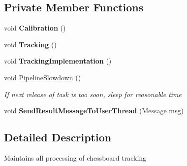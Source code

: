 \subsection*{Private Member Functions}
\begin{DoxyCompactItemize}
\item 
\mbox{\label{class_chess_tracking_1_1_image_processing_1_1_pipeline_parts_1_1_general_1_1_pipeline_a8cbd1f4411b36a3ec951ca8e804c4d10}} 
void {\bfseries Calibration} ()
\item 
\mbox{\label{class_chess_tracking_1_1_image_processing_1_1_pipeline_parts_1_1_general_1_1_pipeline_a1154d48981d3083b4162e49d1e10f9d2}} 
void {\bfseries Tracking} ()
\item 
\mbox{\label{class_chess_tracking_1_1_image_processing_1_1_pipeline_parts_1_1_general_1_1_pipeline_a8c2bf1b5d60c2933f448f337535d6736}} 
void {\bfseries Tracking\+Implementation} ()
\item 
void \mbox{\hyperlink{class_chess_tracking_1_1_image_processing_1_1_pipeline_parts_1_1_general_1_1_pipeline_a6614378b08acc03caa79ba47e3a6871e}{Pipeline\+Slowdown}} ()
\begin{DoxyCompactList}\small\item\em If next release of task is too soon, sleep for reasonable time \end{DoxyCompactList}\item 
\mbox{\label{class_chess_tracking_1_1_image_processing_1_1_pipeline_parts_1_1_general_1_1_pipeline_a1d2d93453628e5c8aaeee9a644ce7da9}} 
void {\bfseries Send\+Result\+Message\+To\+User\+Thread} (\mbox{\hyperlink{class_chess_tracking_1_1_multithreading_messages_1_1_message}{Message}} msg)
\end{DoxyCompactItemize}


\subsection{Detailed Description}
Maintains all processing of chessboard tracking 



